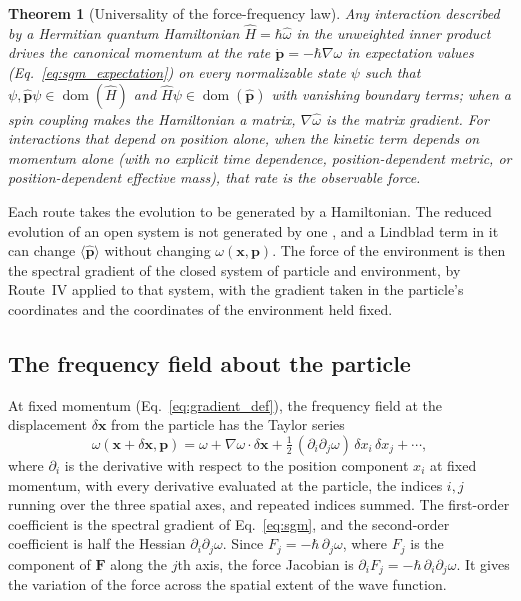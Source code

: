 \documentclass[aps,prd,onecolumn,tightenlines,nofootinbib,notitlepage,11pt,floatfix]{revtex4-2}
\theoremstyle{indentedtheorem}
\newtheorem{theorem}{Theorem}
\begin{document}
\begin{theorem}[Universality of the force-frequency law]\label{thm:universal}
Any interaction described by a Hermitian quantum Hamiltonian $\hat{H}=\hbar\hat{\omega}$ in the unweighted inner product drives the canonical momentum at the rate $\dot{\mathbf{p}}=-\hbar\nabla\omega$ in expectation values (Eq.~\eqref{eq:sgm_expectation}) on every normalizable state $\psi$ such that $\psi,\hat{\mathbf{p}}\psi\in\operatorname{dom}(\hat{H})$ and $\hat{H}\psi\in\operatorname{dom}(\hat{\mathbf{p}})$ with vanishing boundary terms; when a spin coupling makes the Hamiltonian a matrix, $\nabla\hat{\omega}$ is the matrix gradient. For interactions that depend on position alone, when the kinetic term depends on momentum alone (with no explicit time dependence, position-dependent metric, or position-dependent effective mass), that rate is the observable force.
\end{theorem}

Each route takes the evolution to be generated by a Hamiltonian. The reduced evolution of an open system is not generated by one \citep{Lindblad1976Generators}, and a Lindblad term in it can change $\langle\hat{\mathbf{p}}\rangle$ without changing $\omega(\mathbf{x},\mathbf{p})$. The force of the environment is then the spectral gradient of the closed system of particle and environment, by Route~IV applied to that system, with the gradient taken in the particle's coordinates and the coordinates of the environment held fixed.

\subsection{The frequency field about the particle}
\label{sec:taylor_expansion}

At fixed momentum (Eq.~\eqref{eq:gradient_def}), the frequency field at the displacement $\delta\mathbf{x}$ from the particle has the Taylor series
\begin{equation}
    \omega(\mathbf{x}+\delta\mathbf{x},\mathbf{p}) = \omega + \nabla\omega\cdot\delta\mathbf{x} + \tfrac{1}{2}\,(\partial_i\partial_j\omega)\,\delta x_i\,\delta x_j + \cdots ,
    \label{eq:omega_expansion}
\end{equation}
where $\partial_i$ is the derivative with respect to the position component $x_i$ at fixed momentum, with every derivative evaluated at the particle, the indices $i,j$ running over the three spatial axes, and repeated indices summed. The first-order coefficient is the spectral gradient of Eq.~\eqref{eq:sgm}, and the second-order coefficient is half the Hessian $\partial_i\partial_j\omega$. Since $F_j=-\hbar\,\partial_j\omega$, where $F_j$ is the component of $\mathbf{F}$ along the $j$th axis, the force Jacobian is $\partial_i F_j=-\hbar\,\partial_i\partial_j\omega$. It gives the variation of the force across the spatial extent of the wave function.
\end{document}
